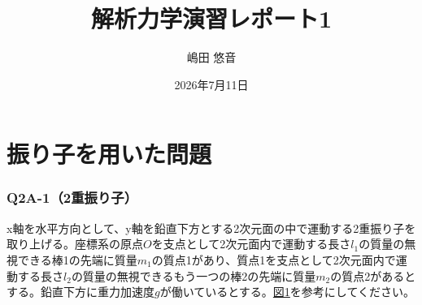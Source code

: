 \newcommand{\hb}[2]{\frac{\partial #1}{\partial #2}}
\newcommand{\bbn}[2]{\frac{d #1}{d #2}}
\newcommand{\nhb}[3]{\frac{\partial^{#1} #2}{\partial #3^{#1}}}
\newcommand{\nbbn}[3]{\frac{d^{#1} #2}{d #3^{#1}}}
\newcommand{\vectxy}[2]{\begin{bmatrix}#1\\#2\end{bmatrix}}
\newcommand{\vectxyz}[3]{\begin{bmatrix}#1\\#2\\#3\end{bmatrix}}
\newcommand{\vect}[1]{\boldsymbol{\mathrm{#1}}}

\newcommand{\ssum}[3]{\sum_{#1=#2}^#3}

\newcommand{\veff}{V_{\mathrm{eff}}(r)}

\title{解析力学演習レポート1}
\author{嶋田 悠音}
\date{2026年7月11日}


  \maketitle
  \begingroup
  \hypersetup{hidelinks}
  \tableofcontents
  \endgroup
  \clearpage

  \part{振り子を用いた問題}
  \section{Q2A-1（2重振り子）}
  x軸を水平方向として、y軸を鉛直下方とする2次元面の中で運動する2重振り子を取り上げる。座標系の原点$O$を支点として2次元面内で運動する長さ$l_1$の質量の無視できる棒1の先端に質量$m_1$の質点1があり、質点1を支点として2次元面内で運動する長さ$l_2$の質量の無視できるもう一つの棒2の先端に質量$m_2$の質点2があるとする。鉛直下方に重力加速度$g$が働いているとする。\hyperref[fig:1]{図1}を参考にしてください。
